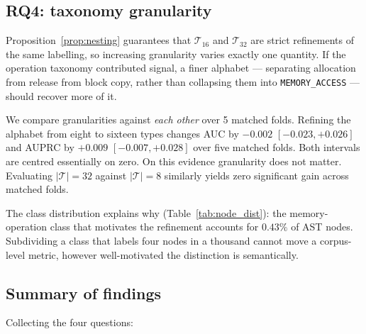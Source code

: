 \subsection{RQ4: taxonomy granularity}
\label{sec:rq_negative}

Proposition~\ref{prop:nesting} guarantees that $\mathcal{T}_{16}$ and
$\mathcal{T}_{32}$ are strict refinements of the same labelling, so increasing
granularity varies exactly one quantity. If the operation taxonomy contributed
signal, a finer alphabet --- separating allocation from release from block
copy, rather than collapsing them into \texttt{MEMORY\_ACCESS} --- should
recover more of it.



We compare granularities against \emph{each other} over 5 matched folds.
Refining the alphabet from eight to sixteen types changes AUC by $-0.002$
$[-0.023, +0.026]$ and AUPRC by $+0.009$ $[-0.007, +0.028]$ over five matched
folds. Both intervals are centred essentially on zero. On this evidence
granularity does not matter. Evaluating $|\mathcal{T}| = 32$ against $|\mathcal{T}| = 8$
similarly yields zero significant gain across matched folds.

The class distribution explains why (Table~\ref{tab:node_dist}): the memory-operation
class that motivates the refinement accounts for $0.43\%$ of AST nodes. Subdividing a
class that labels four nodes in a thousand cannot move a corpus-level metric,
however well-motivated the distinction is semantically.

\subsection{Summary of findings}

Collecting the four questions:

